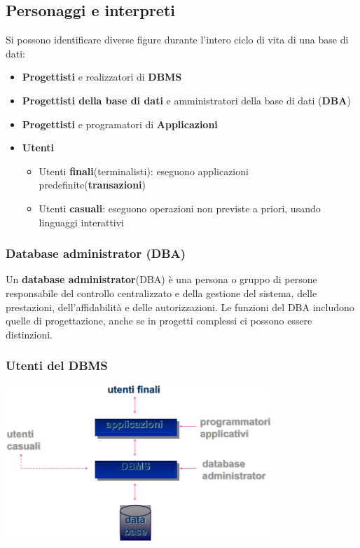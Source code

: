 \documentclass[12pt]{article}
\begin{document}
\subsection{Personaggi e interpreti}
Si possono identificare diverse figure durante l'intero ciclo di vita di una base di dati:
\begin{itemize}
    \item \textbf{Progettisti} e realizzatori di \textbf{DBMS}
    \item \textbf{Progettisti della base di dati} e amministratori della base di dati (\textbf{DBA})
    \item \textbf{Progettisti} e programatori di \textbf{Applicazioni}
    \item \textbf{Utenti}
    \begin{itemize}
        \item Utenti \textbf{finali}(terminalisti): eseguono applicazioni predefinite(\textbf{transazioni})
        \item Utenti \textbf{casuali}: eseguono operazioni non previste a priori, usando linguaggi interattivi
    \end{itemize}
\end{itemize}
\subsubsection{Database administrator (DBA)}
Un \textbf{database administrator}(DBA) è una persona o gruppo di persone responsabile del controllo centralizzato e della gestione del sistema, delle prestazioni, dell'affidabilità e delle autorizzazioni.
Le funzioni del DBA includono quelle di progettazione, anche se in progetti complessi ci possono essere distinzioni.
\subsubsection{Utenti del DBMS}
\begin{center}
    \includegraphics[width = 0.75\textwidth]{Images/10.PNG}
\end{center}
\end{document}
